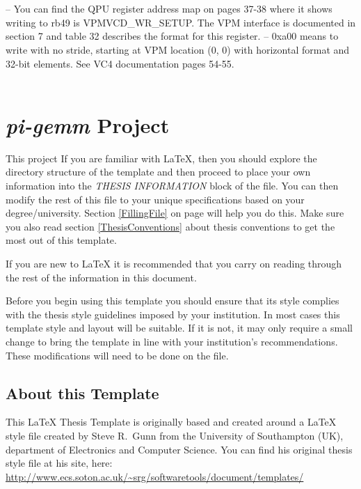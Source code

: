 \\
\\
-- You can find the QPU register address map on pages 37-38 where it shows writing to rb49 is VPMVCD\_WR\_SETUP. The VPM interface is documented in section 7 and table 32 describes the format for this register.
-- 0xa00 means to write with no stride, starting at VPM location (0, 0) with horizontal format and 32-bit elements. See VC4 documentation pages 54-55.\\~\\

\section{\emph{pi-gemm} Project}

This project \parencite{refPiGemm}
If you are familiar with \LaTeX{}, then you should explore the directory structure of the template and then proceed to place your own information into the \emph{THESIS INFORMATION} block of the  file. You can then modify the rest of this file to your unique specifications based on your degree/university. Section \ref{FillingFile} on page \pageref{FillingFile} will help you do this. Make sure you also read section \ref{ThesisConventions} about thesis conventions to get the most out of this template.

If you are new to \LaTeX{} it is recommended that you carry on reading through the rest of the information in this document.

Before you begin using this template you should ensure that its style complies with the thesis style guidelines imposed by your institution. In most cases this template style and layout will be suitable. If it is not, it may only require a small change to bring the template in line with your institution's recommendations. These modifications will need to be done on the  file.

\subsection{About this Template}

This \LaTeX{} Thesis Template is originally based and created around a \LaTeX{} style file created by Steve R.\ Gunn from the University of Southampton (UK), department of Electronics and Computer Science. You can find his original thesis style file at his site, here:
\url{http://www.ecs.soton.ac.uk/~srg/softwaretools/document/templates/}

